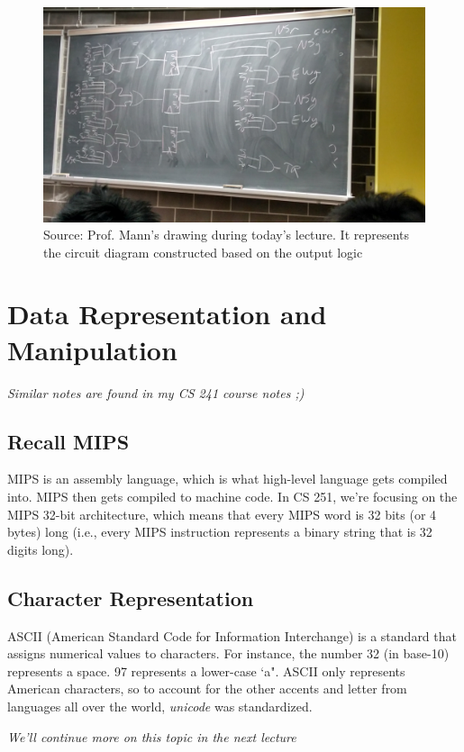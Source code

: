 \documentclass{report}
\begin{document}
\begin{figure}[ht]
\begin{center}
\includegraphics[scale=0.14]{circuit-diagram.jpg}
\end{center}
\caption{Source: Prof. Mann's drawing during today's lecture. It represents the circuit diagram constructed based on the output logic}
\end{figure}

\newpage
\section{Data Representation and Manipulation}
\textit{Similar notes are found in my CS 241 course notes ;)}
\subsection{Recall MIPS}
MIPS is an assembly language, which is what high-level language gets compiled into. MIPS then gets compiled to machine code. In CS 251, we're focusing on the MIPS 32-bit architecture, which means that every MIPS word is 32 bits (or 4 bytes) long (i.e., every MIPS instruction represents a binary string that is 32 digits long).
\subsection{Character Representation}
ASCII (American Standard Code for Information Interchange) is a standard that assigns numerical values to characters. For instance, the number 32 (in base-10) represents a space. 97 represents a lower-case `a". ASCII only represents American characters, so to account for the other accents and letter from languages all over the world, \textit{unicode} was standardized.
\begin{center}
\textit{We'll continue more on this topic in the next lecture}
\end{center}
\end{document}
